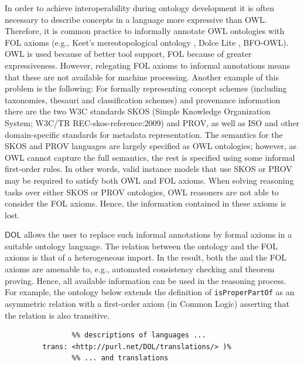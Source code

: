 \documentclass[10pt,fleqn,final]{scrreprt}
\newcommand*{\DOL}{\ensuremath{\mathsf{DOL}}\xspace}
\newcommand{\nisref}[1]{#1}
\newenvironment{definitions}[0]{\medskip }{}
\begin{document}
\begin{definitions}
In order to achieve interoperability during ontology development it is often necessary to describe 
concepts in a language more expressive than OWL.  Therefore, it is common practice to informally 
annotate OWL ontologies with FOL axioms (e.g., Keet's mereotopological ontology \cite{KeetEtAl12}, 
Dolce Lite \cite{dolce-web}, BFO-OWL). OWL is used because of better tool support, FOL because of 
greater expressiveness. However, relegating FOL axioms to  informal annotations means that these 
are not available for machine processing.  Another example of this problem is the following: For 
formally representing concept schemes (including taxonomies, thesauri and classification schemes) 
and provenance information there are the two W3C standards SKOS (Simple Knowledge Organization 
System; \nisref{W3C/TR REC-skos-reference:2009}) and PROV, as well as ISO and other domain-specific  standards for 
metadata representation. The semantics for the SKOS and PROV languages are largely specified as OWL 
ontologies; however, as OWL cannot capture the full semantics, the rest is specified using some 
informal first-order rules. In other words, valid instance models that use SKOS or PROV may be 
required to satisfy both OWL and FOL axioms. When solving reasoning tasks over either SKOS or PROV 
ontologies, OWL reasoners are not able to consider the  FOL axioms. Hence, the information 
contained in these axioms is lost.

\DOL allows the user to replace such informal annotations by formal axioms in a suitable ontology 
language. The relation between the \OWL ontology and the FOL axioms is that of a heterogeneous 
import. In the result, both the \OWL and the FOL axioms are amenable to, e.g., automated consistency 
checking and theorem proving. Hence, all available information can be used in the reasoning process.
For example, the ontology below extends the \OWL definition of \texttt{isProperPartOf} as an asymmetric relation
with a first-order axiom (in Common Logic) asserting that the relation is also transitive.
\begin{lstlisting}[basicstyle=\small\ttfamily,language=dolText,alsolanguage=clif,alsolanguage=owl2Manchester,escapechar=@,mathescape]
%prefix( lang:  <http://purl.net/DOL/languages/>
                %% descriptions of languages ...
         trans: <http://purl.net/DOL/translations/> )%
                %% ... and translations


\end{lstlisting}
\end{definitions}
\end{document}
